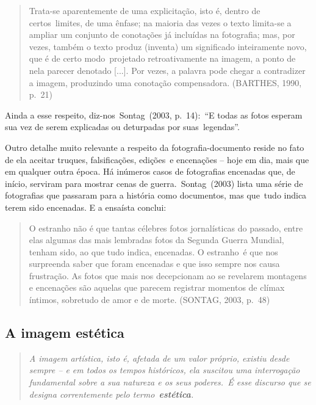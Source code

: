 \documentclass[
  letterpaper,
]{scrbook}
\begin{document}
\begin{quote}
Trata-se aparentemente de uma explicitação, isto é, dentro de
certos~limites, de uma ênfase; na maioria das vezes o texto limita-se a
ampliar um conjunto de conotações já incluídas na fotografia; mas, por
vezes, também o texto produz (inventa) um significado inteiramente novo,
que é de certo modo~projetado retroativamente na imagem, a ponto de nela
parecer denotado {[}...{]}. Por vezes, a palavra pode chegar a
contradizer a imagem, produzindo uma conotação compensadora. (BARTHES,
1990, p.~21)~ ~
\end{quote}

Ainda a esse respeito, diz-nos~Sontag~(2003, p.~14):~``E todas as fotos
esperam sua vez de serem explicadas ou deturpadas por suas~legendas''.

Outro detalhe muito relevante a respeito da fotografia-documento reside
no fato de ela aceitar truques, falsificações, edições~e encenações --
hoje em dia, mais que em qualquer outra época. Há inúmeros casos de
fotografias encenadas que, de início, serviram para mostrar cenas de
guerra.~Sontag~(2003) lista uma série de fotografias que passaram para a
história como documentos, mas que~tudo indica terem sido encenadas. E a
ensaísta conclui:~ ~

\begin{quote}
O estranho não é que tantas célebres fotos jornalísticas do passado,
entre elas algumas das mais lembradas fotos da Segunda Guerra Mundial,
tenham sido, ao que tudo indica, encenadas. O estranho~é que nos
surpreenda saber que foram encenadas e que isso sempre nos causa
frustração. As fotos que mais nos decepcionam ao se revelarem montagens
e encenações são aquelas que parecem registrar momentos de clímax
íntimos, sobretudo de amor e de morte. (SONTAG, 2003, p.~48)~ ~
\end{quote}

\hypertarget{a-imagem-estuxe9tica}{%
\subsection{A imagem estética}\label{a-imagem-estuxe9tica}}

\begin{quote}
\emph{A imagem artística, isto é, afetada de um valor próprio, existiu
desde sempre -- e em todos os tempos históricos, ela suscitou uma
interrogação fundamental sobre a sua natureza e os seus poderes.~É esse
discurso que se designa correntemente pelo termo~\textbf{estética}.}
\end{quote}
\end{document}
